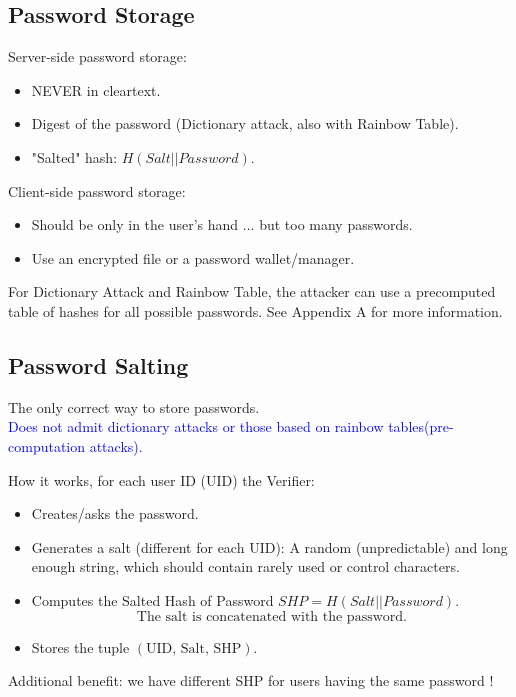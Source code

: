 \subsection*{Password Storage}
\begin{multicols}{2}
    Server-side password storage:
    \begin{itemize}
        \item NEVER in cleartext.
        \item Digest of the password (Dictionary attack, also with Rainbow Table).
        \item "Salted" hash: $H(Salt || Password)$.
    \end{itemize}
    
    \columnbreak

    Client-side password storage:
    \begin{itemize}
        \item Should be only in the user's hand ... but too many passwords.
        \item Use an encrypted file or a password wallet/manager.
    \end{itemize}
\end{multicols}

\begin{tcolorbox}[colback=blue!10!white, colframe=blue!50!white]
For Dictionary Attack and Rainbow Table, the attacker can use a precomputed table of hashes for all possible passwords. See Appendix A for more information.
\end{tcolorbox}

\subsection{Password Salting}
\begin{center}
    The only correct way to store passwords.\\ \textcolor{Blue}{Does not admit dictionary attacks or those based on rainbow tables(pre-computation attacks).}
\end{center}
How it works, for each user ID (UID) the Verifier:
\begin{itemize}
    \item Creates/asks the password.
    \item Generates a salt (different for each UID): A random (unpredictable) and long enough string, which should contain rarely used or control characters.
    \item Computes the Salted Hash of Password \(SHP = H(Salt || Password)\).
    \[\text{The salt is concatenated with the password.} \]
    \item Stores the tuple \((\text{UID, Salt, SHP})\).
\end{itemize}
Additional benefit: we have different SHP for users having the same password !


